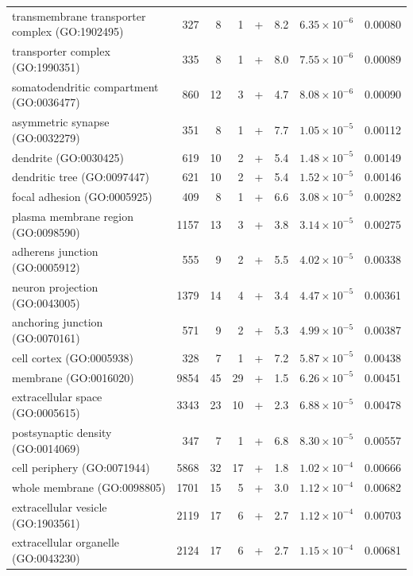 \begin{table}[ht]
\begin{adjustbox}{width=\textwidth}
\begin{tabular}{lrrrlrrr}
  transmembrane transporter complex (GO:1902495) & 327 & 8 & 1 & + & 8.2 & $6.35 \times 10^{-6}$ & 0.00080 \\ 
  transporter complex (GO:1990351) & 335 & 8 & 1 & + & 8.0 & $7.55 \times 10^{-6}$ & 0.00089 \\ 
  somatodendritic compartment (GO:0036477) & 860 & 12 & 3 & + & 4.7 & $8.08 \times 10^{-6}$ & 0.00090 \\ 
  asymmetric synapse (GO:0032279) & 351 & 8 & 1 & + & 7.7 & $1.05 \times 10^{-5}$ & 0.00112 \\ 
  dendrite (GO:0030425) & 619 & 10 & 2 & + & 5.4 & $1.48 \times 10^{-5}$ & 0.00149 \\ 
  dendritic tree (GO:0097447) & 621 & 10 & 2 & + & 5.4 & $1.52 \times 10^{-5}$ & 0.00146 \\ 
  focal adhesion (GO:0005925) & 409 & 8 & 1 & + & 6.6 & $3.08 \times 10^{-5}$ & 0.00282 \\ 
  plasma membrane region (GO:0098590) & 1157 & 13 & 3 & + & 3.8 & $3.14 \times 10^{-5}$ & 0.00275 \\ 
  adherens junction (GO:0005912) & 555 & 9 & 2 & + & 5.5 & $4.02 \times 10^{-5}$ & 0.00338 \\ 
  neuron projection (GO:0043005) & 1379 & 14 & 4 & + & 3.4 & $4.47 \times 10^{-5}$ & 0.00361 \\ 
  anchoring junction (GO:0070161) & 571 & 9 & 2 & + & 5.3 & $4.99 \times 10^{-5}$ & 0.00387 \\ 
  cell cortex (GO:0005938) & 328 & 7 & 1 & + & 7.2 & $5.87 \times 10^{-5}$ & 0.00438 \\ 
  membrane (GO:0016020) & 9854 & 45 & 29 & + & 1.5 & $6.26 \times 10^{-5}$ & 0.00451 \\ 
  extracellular space (GO:0005615) & 3343 & 23 & 10 & + & 2.3 & $6.88 \times 10^{-5}$ & 0.00478 \\ 
  postsynaptic density (GO:0014069) & 347 & 7 & 1 & + & 6.8 & $8.30 \times 10^{-5}$ & 0.00557 \\ 
  cell periphery (GO:0071944) & 5868 & 32 & 17 & + & 1.8 & $1.02 \times 10^{-4}$ & 0.00666 \\ 
  whole membrane (GO:0098805) & 1701 & 15 & 5 & + & 3.0 & $1.12 \times 10^{-4}$ & 0.00682 \\ 
  extracellular vesicle (GO:1903561) & 2119 & 17 & 6 & + & 2.7 & $1.12 \times 10^{-4}$ & 0.00703 \\ 
  extracellular organelle (GO:0043230) & 2124 & 17 & 6 & + & 2.7 & $1.15 \times 10^{-4}$ & 0.00681 \\ 

\end{tabular}
\end{adjustbox}
\end{table}
